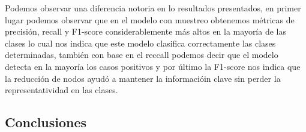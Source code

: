Podemos observar una diferencia notoria en lo resultados presentados, en primer lugar podemos observar que en el modelo con muestreo obtenemos métricas de precisión, recall y F1-score considerablemente más altos en la mayoría de las clases lo cual nos indica que este modelo clasifica correctamente las clases determinadas, también con base en el reccall podemos decir que el modelo detecta en la mayoría los casos positivos y por último la F1-score nos indica que la reducción de nodos ayudó a mantener la informacióin clave sin perder la representatividad en las clases.



\subsection{Conclusiones}